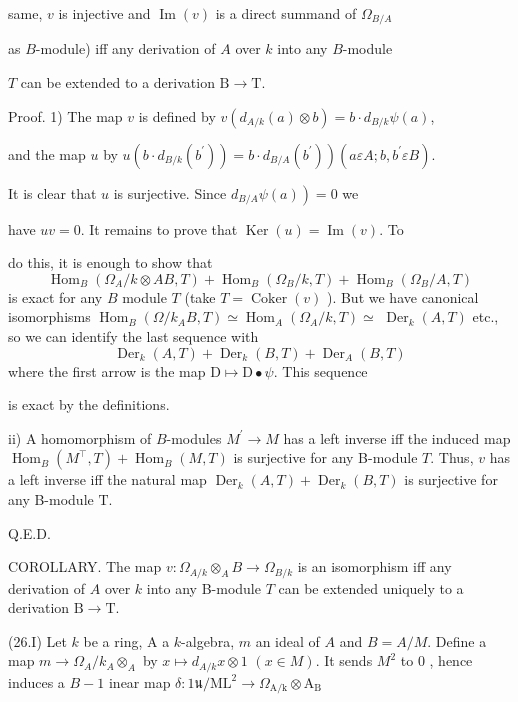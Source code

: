 same, $v$ is injective and $\operatorname{Im}(v)$ is a direct summand of $\Omega_{B / A}$

as $B$-module) iff any derivation of $A$ over $k$ into any $B$-module

$T$ can be extended to a derivation $\mathrm{B} \rightarrow \mathrm{T}$.

Proof. 1) The map $v$ is defined by $v\left(d_{A / k}(a) \otimes b\right)=b \cdot d_{B / k} \psi(a)$,

and the map $u$ by $\left.u\left(b \cdot d_{B / k}\left(b^{\prime}\right)\right)=b \cdot d_{B / A}\left(b^{\prime}\right)\right)\left(a \varepsilon A ; b, b^{\prime} \varepsilon B\right)$.

It is clear that $u$ is surjective. Since $\left.d_{B / A} \psi(a)\right)=0$ we

have $u v=0 .$ It remains to prove that $\operatorname{Ker}(u)=\operatorname{Im}(v)$. To

do this, it is enough to show that
$$
\operatorname{Hom}_{B}\left(\Omega_{A} / k \otimes A B, T\right)+\operatorname{Hom}_{B}\left(\Omega_{B} / k, T\right)+\operatorname{Hom}_{B}\left(\Omega_{B} / A, T\right)
$$
is exact for any $B$ module $T$ (take $T=\operatorname{Coker}(v)$ ). But we have canonical isomorphisms $\operatorname{Hom}_{B}\left(\Omega / k_{A} B, T\right) \simeq \operatorname{Hom}_{A}\left(\Omega_{A} / k, T\right) \simeq$ $\operatorname{Der}_{k}(A, T)$ etc., so we can identify the last sequence with
$$
\operatorname{Der}_{k}(A, T)+\operatorname{Der}_{k}(B, T)+\operatorname{Der}_{A}(B, T)
$$
where the first arrow is the map $\mathrm{D} \mapsto \mathrm{D} \bullet \psi$. This sequence

is exact by the definitions.

ii) A homomorphism of $B$-modules $M^{\prime} \rightarrow M$ has a left inverse iff the induced map $\operatorname{Hom}_{B}\left(M^{\top}, T\right)+\operatorname{Hom}_{B}(M, T)$ is surjective for any B-module $T$. Thus, $v$ has a left inverse iff the natural map $\operatorname{Der}_{k}(A, T)+\operatorname{Der}_{k}(B, T)$ is surjective for any B-module $\mathrm{T}$.

Q.E.D.

COROLLARY. The map $v: \Omega_{A / k} \otimes_{A} B \rightarrow \Omega_{B / k}$ is an isomorphism iff any derivation of $A$ over $k$ into any B-module $T$ can be extended uniquely to a derivation $\mathrm{B} \rightarrow \mathrm{T}$.

(26.I) Let $k$ be a ring, A a $k$-algebra, $m$ an ideal of $A$ and $B=A / M$. Define a map $m \rightarrow \Omega_{A} / k_{A} \otimes_{A}$ by $x \mapsto d_{A / k} x \otimes 1$ $(x \in M)$. It sends $M^{2}$ to 0 , hence induces a $B-1$ inear map $\delta: 1 น / \mathrm{ML}^{2} \rightarrow \Omega_{\mathrm{A} / \mathrm{k}} \otimes \mathrm{A}_{\mathrm{B}}$

